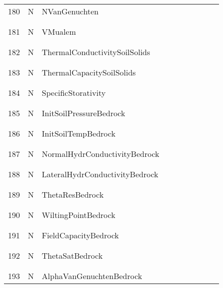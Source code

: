 \begin{longtable}{|c|c|l|c|c|c|c|p{}|c|p{}|}
180 & N & NVanGenuchten & & & & & & & \\
&&&&&&&&&\\\hline%
&&&&&&&&&\\
181 & N & VMualem & & & & & & & \\
&&&&&&&&&\\\hline%
&&&&&&&&&\\
182 & N & ThermalConductivitySoilSolids & & & & & & & \\
&&&&&&&&&\\\hline%
&&&&&&&&&\\
183 & N & ThermalCapacitySoilSolids & & & & & & & \\
&&&&&&&&&\\\hline%
&&&&&&&&&\\
184 & N & SpecificStorativity & & & & & & & \\
&&&&&&&&&\\\hline%
&&&&&&&&&\\
185 & N & InitSoilPressureBedrock & & & & & & & \\
&&&&&&&&&\\\hline%
&&&&&&&&&\\
186 & N & InitSoilTempBedrock & & & & & & & \\
&&&&&&&&&\\\hline%
&&&&&&&&&\\
187 & N & NormalHydrConductivityBedrock & & & & & & & \\
&&&&&&&&&\\\hline%
&&&&&&&&&\\
188 & N & LateralHydrConductivityBedrock & & & & & & & \\
&&&&&&&&&\\\hline%
&&&&&&&&&\\
189 & N & ThetaResBedrock & & & & & & & \\
&&&&&&&&&\\\hline%
&&&&&&&&&\\
190 & N & WiltingPointBedrock & & & & & & & \\
&&&&&&&&&\\\hline%
&&&&&&&&&\\
191 & N & FieldCapacityBedrock & & & & & & & \\
&&&&&&&&&\\\hline%
&&&&&&&&&\\
192 & N & ThetaSatBedrock & & & & & & & \\
&&&&&&&&&\\\hline%
&&&&&&&&&\\
193 & N & AlphaVanGenuchtenBedrock & & & & & & & \\

\end{longtable}
